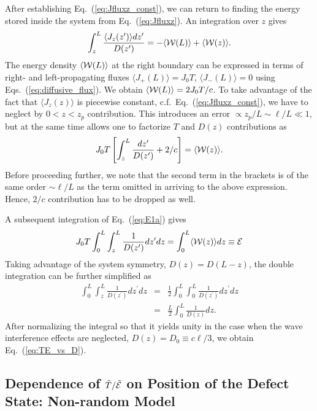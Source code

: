 After establishing Eq.~(\ref{eq:Jfluxz_const}), we can return to finding the energy stored inside the system from Eq.~(\ref{eq:Jfluxz}). An integration over $z$ gives
\begin{equation}
\displaystyle\int_z^L\frac{\langle J_z(z^\prime)\rangle dz^\prime}{D(z^\prime)}=-\langle {\cal W}(L)\rangle + \langle {\cal W}(z)\rangle.
\label{eq:E1}
\end{equation}
The energy density $\langle {\cal W}(L)\rangle$ at the right boundary can be expressed in terms of right- and left-propagating fluxes $\langle J_+(L)\rangle=J_0T$, $\langle J_-(L)\rangle=0$ using Eqs.~(\ref{eq:diffusive_flux}). We obtain $\langle {\cal W}(L)\rangle=2J_0T/c$. To take advantage of the fact that $\langle J_z(z)\rangle$ is piecewise constant, c.f.~Eq.~(\ref{eq:Jfluxz_const}), we have to neglect by $0<z<z_p$ contribution. This introduces an error $\propto z_p/L\sim\ell/L\ll 1$, but at the same time allows one to factorize $T$ and $D(z)$ contributions as
\begin{equation}
J_0T\left[\displaystyle\int_z^L\frac{dz^\prime}{D(z^\prime)}+2/c\right]= \langle {\cal W}(z)\rangle.
\label{eq:E1a}
\end{equation}
Before proceeding further, we note that the second term in the brackets is of the same order $\sim \ell/L$ as the term  omitted in arriving to the above expression. Hence, $2/c$ contribution has to be dropped as well.

A subsequent integration of Eq.~(\ref{eq:E1a}) gives 
\begin{equation}
J_0T\displaystyle\int_{0}^{L}\int_{z}^{L}\displaystyle\frac{1}{D(z^\prime)}dz^\prime dz=
\displaystyle\int_0^L \langle {\cal W}(z)\rangle dz
\equiv{\cal E}
\label{eq:E2}
\end{equation}
Taking advantage of the system symmetry, $D(z)=D(L-z)$, the double integration can be further simplified as
\begin{eqnarray}
\displaystyle\int_{0}^{L}\int_{z}^{L}\displaystyle\frac{1}{D(z^\prime)}dz^\prime dz &=&\frac{1}{2}\displaystyle\int_{0}^{L}\int_{0}^{L}\displaystyle\frac{1}{D(z^\prime)}dz^\prime dz \nonumber\\
&=&\frac{L}{2}\int_{0}^{L}\displaystyle\frac{1}{D(z)}dz.
\label{eq:E3}
\end{eqnarray}
After normalizing the integral so that it yields unity in the case when the wave interference effects are neglected, $D(z)=D_0\equiv c\ell/3$, we obtain Eq.~(\ref{eq:TE_vs_D}).

\subsection{Dependence of \texorpdfstring{$\tilde{T}/\tilde{\cal E}$}{T/E} on Position of the Defect State: Non-random Model}
\label{app:qm_model}

